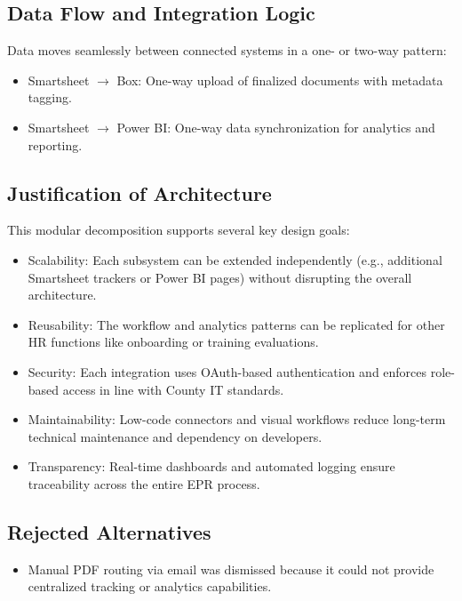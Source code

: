 \documentclass[12pt]{article}
\def\textbf#1{#1}%
\begin{document}
\subsection{Data Flow and Integration Logic}
Data moves seamlessly between connected systems in a one- or two-way pattern:
\begin{itemize}
  \item Smartsheet $\rightarrow$ Box: One-way upload of finalized documents with metadata tagging.
  \item Smartsheet $\rightarrow$ Power BI: One-way data synchronization for analytics and reporting.
\end{itemize}

\subsection{Justification of Architecture}
This modular decomposition supports several key design goals:

\begin{itemize}
  \item \textbf{Scalability:} Each subsystem can be extended independently (e.g., additional Smartsheet trackers or Power BI pages) without disrupting the overall architecture.
  \item \textbf{Reusability:} The workflow and analytics patterns can be replicated for other HR functions like onboarding or training evaluations.
  \item \textbf{Security:} Each integration uses OAuth-based authentication and enforces role-based access in line with County IT standards.
  \item \textbf{Maintainability:} Low-code connectors and visual workflows reduce long-term technical maintenance and dependency on developers.
  \item \textbf{Transparency:} Real-time dashboards and automated logging ensure traceability across the entire EPR process.
\end{itemize}

\subsection{Rejected Alternatives}
\begin{itemize}
  \item Manual PDF routing via email was dismissed because it could not provide centralized tracking or analytics capabilities.
\end{itemize}
\end{document}
